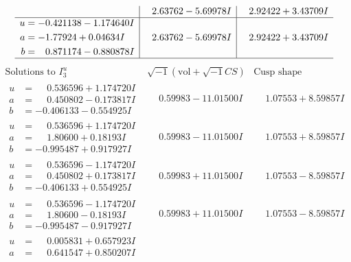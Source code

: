 \documentclass[1p]{elsarticle_modified}
\theoremstyle{definition}
\newcommand{\I}{\sqrt{-1}}
\begin{document}
$$\begin{array}{c|c|c}
 & \phantom{-}2.63762 - 5.69978 I & \phantom{-}2.92422 + 3.43709 I \\ \hline\begin{aligned}
u &= -0.421138 - 1.174640 I \\
a &= -1.77924 + 0.04634 I \\
b &= \phantom{-}0.871174 - 0.880878 I\end{aligned}
 & \phantom{-}2.63762 - 5.69978 I & \phantom{-}2.92422 + 3.43709 I\\
 \hline 
 \end{array}$$\newpage$$\begin{array}{c|c|c}  
\text{Solutions to }I^u_{3}& \I (\text{vol} + \sqrt{-1}CS) & \text{Cusp shape}\\
 \hline 
\begin{aligned}
u &= \phantom{-}0.536596 + 1.174720 I \\
a &= \phantom{-}0.450802 - 0.173817 I \\
b &= -0.406133 - 0.554925 I\end{aligned}
 & \phantom{-}0.59983 - 11.01500 I & \phantom{-}1.07553 + 8.59857 I \\ \hline\begin{aligned}
u &= \phantom{-}0.536596 + 1.174720 I \\
a &= \phantom{-}1.80600 + 0.18193 I \\
b &= -0.995487 + 0.917927 I\end{aligned}
 & \phantom{-}0.59983 - 11.01500 I & \phantom{-}1.07553 + 8.59857 I \\ \hline\begin{aligned}
u &= \phantom{-}0.536596 - 1.174720 I \\
a &= \phantom{-}0.450802 + 0.173817 I \\
b &= -0.406133 + 0.554925 I\end{aligned}
 & \phantom{-}0.59983 + 11.01500 I & \phantom{-}1.07553 - 8.59857 I \\ \hline\begin{aligned}
u &= \phantom{-}0.536596 - 1.174720 I \\
a &= \phantom{-}1.80600 - 0.18193 I \\
b &= -0.995487 - 0.917927 I\end{aligned}
 & \phantom{-}0.59983 + 11.01500 I & \phantom{-}1.07553 - 8.59857 I \\ \hline\begin{aligned}
u &= \phantom{-}0.005831 + 0.657923 I \\
a &= \phantom{-}0.641547 + 0.850207 I \\

\end{aligned}
\end{array}$$
\end{document}
